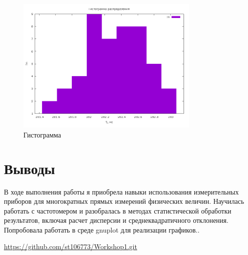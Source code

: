 \begin{figure}[ht!]
\centering
\includegraphics[width=0.8\textwidth]{histogram_rounded.png}
\caption{Гистограмма}
\label{fig:plot}
\end{figure}

\clearpage
\section{Выводы}
В ходе выполнения работы я приобрела навыки использования измерительных приборов для многократных прямых измерений физических величин. 
Научилась работать с частотомером и разобралась в методах статистической обработки результатов, включая расчет дисперсии и среднеквадратичного отклонения. Попробовала работать в среде gnuplot для реализации графиков.. 

\begin{thebibliography}{9}

\url{https://github.com/st106773/Workshop1.git} 

\end{thebibliography}


